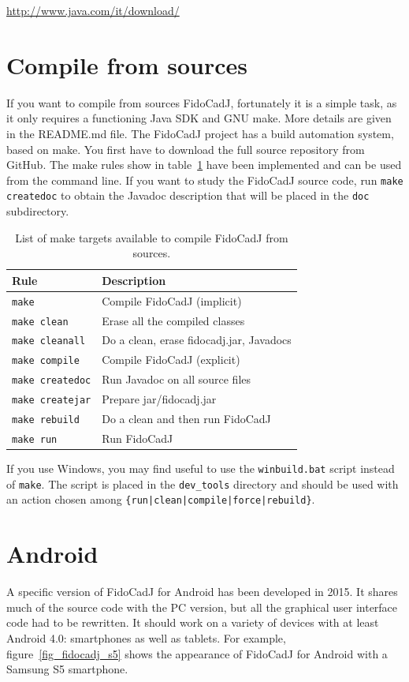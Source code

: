 \documentclass[10pt,a4paper,twoside]{scrreprt}
\begin{document}
\href{http://www.java.com/it/download/}{http://www.java.com/it/download/}

\section{Compile from sources}
If you want to compile from sources FidoCadJ, fortunately it is a simple task, as it only requires a functioning Java SDK and GNU make. More details are given in the README.md file. The FidoCadJ project has a build automation system, based on make.
You first have to download the full source repository from GitHub. The make rules show in table~\ref{tab_make_targets} have been implemented and can be used from the command line. If you want to study the FidoCadJ source code, run \lstinline!make createdoc! to obtain the Javadoc description that will be placed in the \lstinline!doc! subdirectory.

\begin{table}
\centering
\begin{tabular}{ll}
\hline
\textbf{Rule} & \textbf{Description} \\
\hline
\lstinline!make! & Compile FidoCadJ (implicit)\\
\lstinline!make clean!& Erase all the compiled classes\\
\lstinline!make cleanall!& Do a clean, erase fidocadj.jar, Javadocs\\
\lstinline!make compile!& Compile FidoCadJ (explicit)\\
\lstinline!make createdoc!& Run Javadoc on all source files\\
\lstinline!make createjar!& Prepare jar/fidocadj.jar\\
\lstinline!make rebuild!& Do a clean and then run FidoCadJ\\
\lstinline!make run!& Run FidoCadJ\\
\hline
\end{tabular}
\caption{List of make targets available to compile FidoCadJ from sources.}
\label{tab_make_targets}
\end{table}

If you use Windows, you may find useful to use the \lstinline!winbuild.bat! script instead of \lstinline!make!. The script is placed in the \lstinline!dev_tools! directory and should be used with an action chosen among \lstinline!{run|clean|compile|force|rebuild}!.

\section{Android}
A specific version of FidoCadJ for Android has been developed in 2015. It shares much of the source code with the PC version, but all the graphical user interface code had to be rewritten. It should work on a variety of devices with at least Android 4.0: smartphones as well as tablets. For example, figure~\ref{fig_fidocadj_s5} shows the appearance of FidoCadJ for Android with a Samsung S5 smartphone.
\end{document}
